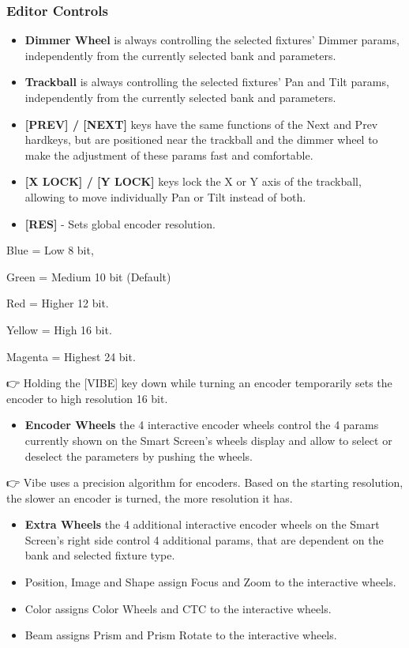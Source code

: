 \documentclass[
]{article}
\providecommand{\tightlist}{%
  \setlength{\itemsep}{0pt}\setlength{\parskip}{0pt}}
\begin{document}
\hypertarget{editor-controls}{%
\subsubsection{Editor Controls}\label{editor-controls}}

\begin{itemize}
\item
  \textbf{Dimmer Wheel} is always controlling the selected fixtures' Dimmer params, independently from the currently selected bank and parameters.
\item
  \textbf{Trackball} is always controlling the selected fixtures' Pan and Tilt params, independently from the currently selected bank and parameters.
\item
  \textbf{{[}PREV{]} / {[}NEXT{]}} keys have the same functions of the Next and Prev hardkeys, but are positioned near the trackball and the dimmer wheel to make the adjustment of these params fast and comfortable.
\item
  \textbf{{[}X LOCK{]} / {[}Y LOCK{]}} keys lock the X or Y axis of the trackball, allowing to move individually Pan or Tilt instead of both.
\item
  \textbf{{[}RES{]}} - Sets global encoder resolution.
\end{itemize}

{Blue} = Low 8 bit,

{Green} = Medium 10 bit (Default)

{Red} = Higher 12 bit.

{Yellow} = High 16 bit.

{Magenta} = Highest 24 bit.

👉 Holding the {[}VIBE{]} key down while turning an encoder temporarily sets the encoder to high resolution 16 bit.

\begin{itemize}
\tightlist
\item
  \textbf{Encoder Wheels} the 4 interactive encoder wheels control the 4 params currently shown on the Smart Screen's wheels display and allow to select or deselect the parameters by pushing the wheels.
\end{itemize}

👉 Vibe uses a precision algorithm for encoders. Based on the starting resolution, the slower an encoder is turned, the more resolution it has.

\begin{itemize}
\item
  \textbf{Extra Wheels} the 4 additional interactive encoder wheels on the Smart Screen's right side control 4 additional params, that are dependent on the bank and selected fixture type.
\item
  Position, Image and Shape assign Focus and Zoom to the interactive wheels.
\item
  Color assigns Color Wheels and CTC to the interactive wheels.
\item
  Beam assigns Prism and Prism Rotate to the interactive wheels.
\end{itemize}
\end{document}
